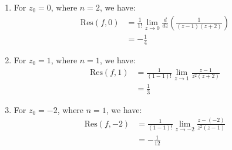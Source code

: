 \documentclass[journal,12pt,twocolumn]{IEEEtran}
\theoremstyle{remark}
\begin{document}
\begin{enumerate}
    \item For $z_0 = 0$, where $n = 2$, we have:
    \begin{align}
    \text{Res}(f, 0) &= \frac{1}{1!} \lim_{z \to 0} \frac{d}{dz} \left( \frac{1}{(z-1)(z+2)} \right) \\
    &= -\frac{1}{4}
    \end{align}
    
    \item For $z_0 = 1$, where $n = 1$, we have:
    \begin{align}
    \text{Res}(f, 1) &= \frac{1}{(1-1)!} \lim_{z \to 1} \frac{z-1}{z^2(z+2)} \\
    &= \frac{1}{3}
    \end{align}
    
    \item For $z_0 = -2$, where $n = 1$, we have:
    \begin{align}
    \text{Res}(f, -2) &= \frac{1}{(1-1)!} \lim_{z \to -2} \frac{z-(-2)}{z^2(z-1)} \\
    &= -\frac{1}{12}
    \end{align}
\end{enumerate}
 \\
\end{document}
